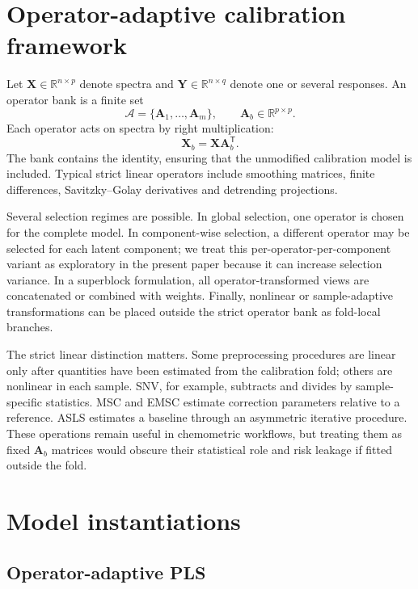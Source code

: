 \documentclass[11pt,a4paper]{article}
\newcommand{\X}{\mathbf{X}}
\newcommand{\Y}{\mathbf{Y}}
\newcommand{\A}{\mathbf{A}}
\newcommand{\R}{\mathbb{R}}
\newcommand{\transpose}{^{\mathsf T}}
\begin{document}
\section{Operator-adaptive calibration framework}

Let $\X\in\R^{n\times p}$ denote spectra and $\Y\in\R^{n\times q}$ denote one
or several responses.  An operator bank is a finite set
\begin{equation}
  \mathcal A = \{\A_1,\ldots,\A_m\}, \qquad \A_b\in\R^{p\times p}.
\end{equation}
Each operator acts on spectra by right multiplication:
\begin{equation}
  \X_b = \X \A_b\transpose .
\end{equation}
The bank contains the identity, ensuring that the unmodified calibration model
is included.  Typical strict linear operators include smoothing matrices,
finite differences, Savitzky--Golay derivatives and detrending projections.

Several selection regimes are possible.  In global selection, one operator is
chosen for the complete model.  In component-wise selection, a different
operator may be selected for each latent component; we treat this
per-operator-per-component variant as exploratory in the present paper because
it can increase selection variance.  In a superblock formulation, all
operator-transformed views are concatenated or combined with weights.  Finally,
nonlinear or sample-adaptive transformations can be placed outside the strict
operator bank as fold-local branches.

The strict linear distinction matters.  Some preprocessing procedures are
linear only after quantities have been estimated from the calibration fold;
others are nonlinear in each sample.  SNV, for example, subtracts and divides
by sample-specific statistics.  MSC and EMSC estimate correction parameters
relative to a reference.  ASLS estimates a baseline through an asymmetric
iterative procedure.  These operations remain useful in chemometric workflows,
but treating them as fixed $\A_b$ matrices would obscure their statistical
role and risk leakage if fitted outside the fold.

\section{Model instantiations}

\subsection{Operator-adaptive PLS}
\end{document}
